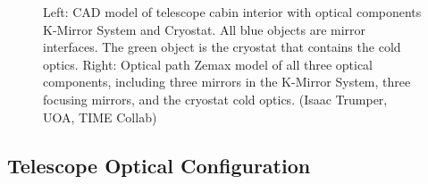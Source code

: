 \documentclass[manuscript]{aastex}
\begin{document}
\begin{figure}[H]%
    \centering
    \qquad
    \singlespace
    \caption[TIME Full Optical Path in Telescope Cabin -(Isaac Trumper, UOA, TIME Collab)]{Left: CAD model of telescope cabin interior with optical components K-Mirror System and Cryostat. All blue objects are mirror interfaces. The green object is the cryostat that contains the cold optics. Right: Optical path {\sc Zemax} model of all three optical components, including three mirrors in the K-Mirror System, three focusing mirrors, and the cryostat cold optics. (Isaac Trumper, UOA, TIME Collab)}%
    \label{fig:optpath}%
    \vspace{-0.8cm}
\end{figure}

\subsection{Telescope Optical Configuration}
\end{document}
